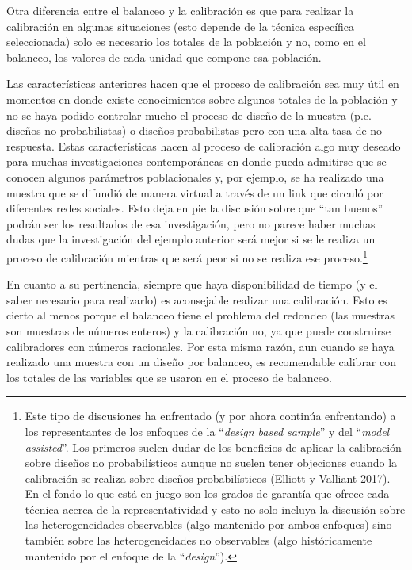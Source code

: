 \documentclass[
  spanish,
  a4paper,
]{scrreprt}
\begin{document}
Otra diferencia entre el balanceo y la calibración es que para realizar
la calibración en algunas situaciones (esto depende de la técnica
específica seleccionada) solo es necesario los totales de la población y
no, como en el balanceo, los valores de cada unidad que compone esa
población.

Las características anteriores hacen que el proceso de calibración sea
muy útil en momentos en donde existe conocimientos sobre algunos totales
de la población y no se haya podido controlar mucho el proceso de diseño
de la muestra (p.e. diseños no probabilistas) o diseños probabilistas
pero con una alta tasa de no respuesta. Estas características hacen al
proceso de calibración algo muy deseado para muchas investigaciones
contemporáneas en donde pueda admitirse que se conocen algunos
parámetros poblacionales y, por ejemplo, se ha realizado una muestra que
se difundió de manera virtual a través de un link que circuló por
diferentes redes sociales. Esto deja en pie la discusión sobre que ``tan
buenos'' podrán ser los resultados de esa investigación, pero no parece
haber muchas dudas que la investigación del ejemplo anterior será mejor
si se le realiza un proceso de calibración mientras que será peor si no
se realiza ese proceso.\footnote{Este tipo de discusiones ha enfrentado
  (y por ahora continúa enfrentando) a los representantes de los
  enfoques de la ``\emph{design based sample}'' y del ``\emph{model
  assisted}''. Los primeros suelen dudar de los beneficios de aplicar la
  calibración sobre diseños no probabilísticos aunque no suelen tener
  objeciones cuando la calibración se realiza sobre diseños
  probabilísticos (Elliott y Valliant 2017). En el fondo lo que está en
  juego son los grados de garantía que ofrece cada técnica acerca de la
  representatividad y esto no solo incluya la discusión sobre las
  heterogeneidades observables (algo mantenido por ambos enfoques) sino
  también sobre las heterogeneidades no observables (algo históricamente
  mantenido por el enfoque de la ``\emph{design}'').}

En cuanto a su pertinencia, siempre que haya disponibilidad de tiempo (y
el saber necesario para realizarlo) es aconsejable realizar una
calibración. Esto es cierto al menos porque el balanceo tiene el
problema del redondeo (las muestras son muestras de números enteros) y
la calibración no, ya que puede construirse calibradores con números
racionales. Por esta misma razón, aun cuando se haya realizado una
muestra con un diseño por balanceo, es recomendable calibrar con los
totales de las variables que se usaron en el proceso de balanceo.
\end{document}
